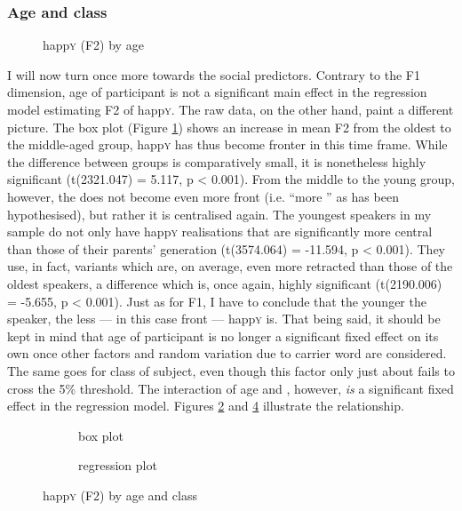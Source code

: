 \subsubsection{Age and class}
\label{sec.prod.res.vow.happy.f2.ageclass}

\begin{figure}[h!]
	\centering
		\resizebox{.5\linewidth}{!}{} 
	\caption{happ\textsc{y} (F2) by age}
	\label{fig.box.f2w.happy.tot}
\end{figure}

I will now turn once more towards the social predictors.
Contrary to the F1 dimension, age of participant is not a significant main effect in the regression model estimating F2 of happ\textsc{y}.
The raw data, on the other hand, paint a different picture.
The box plot (Figure \ref{fig.box.f2w.happy.tot}) shows an increase in mean F2 from the oldest to the middle-aged group, happ\textsc{y} has thus become fronter in this time frame.
While the difference between groups is comparatively small, it is nonetheless highly significant (t(2321.047) = 5.117, p < 0.001).
From the middle to the young group, however, the  does not become even more front (i.e. ``more '' as has been hypothesised), but rather it is centralised again.
The youngest speakers in my sample do not only have happ\textsc{y} realisations that are significantly more central than those of their parents' generation (t(3574.064) = -11.594, p < 0.001).
They use, in fact, variants which are, on average, even more retracted than those of the oldest speakers, a difference which is, once again, highly significant (t(2190.006) = -5.655, p < 0.001).
Just as for F1, I have to conclude that the younger the speaker, the less  --- in this case front --- happ\textsc{y} is.
That being said, it should be kept in mind that age of participant is no longer a significant fixed effect on its own once other factors and random variation due to carrier word are considered.
The same goes for class of subject, even though this factor only just about fails to cross the 5\% threshold.
The interaction of age and , however, \emph{is} a significant fixed effect in the regression model.
Figures \ref{fig.box.f2w.happy.ageclass} and \ref{fig.scatter.f2w.happy.ageclass} illustrate the relationship.

\begin{figure}[h!]
	\centering
	\begin{subfigure}{.49\textwidth}
		\centering
			\resizebox{\linewidth}{!}{} 
		\caption{box plot}
		\label{fig.box.f2w.happy.ageclass}
	\end{subfigure}
	\begin{subfigure}{.49\textwidth}
		\centering
			\resizebox{\linewidth}{!}{} 
		\caption{regression plot}
		\label{fig.scatter.f2w.happy.ageclass}
	\end{subfigure}
	\caption{happ\textsc{y} (F2) by age and class}
\end{figure}


